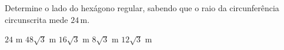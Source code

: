 \noindent\parbox{\linewidth}{

Determine o lado do hexágono regular, sabendo que o raio da circunferência circunscrita mede $24$\,m.

$24$ m
$48\sqrt{3}$ m
$16\sqrt{3}$ m
$8\sqrt{3}$ m
$12\sqrt{3}$ m



}



